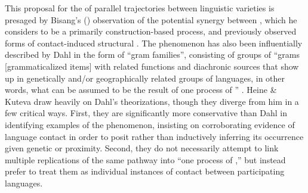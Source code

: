 \documentclass[output=paper]{langsci/langscibook}
\begin{document}
This proposal for the  of parallel  trajectories between linguistic varieties is presaged by Bisang's (\citeyear{Bisang1998}) observation of the potential synergy between , which he considers to be a primarily construction-based process, and previously observed forms of contact-induced structural . The phenomenon has also been influentially described by Dahl in the form of “gram families”, consisting of groups of “grams [grammaticalized items] with related functions and diachronic sources that show up in genetically and/or geographically related groups of languages, in other words, what can be assumed to be the result of one process of ” \citep[1469]{Dahl2001}. Heine \& Kuteva draw heavily on Dahl’s theorizations, though they diverge from him in a few critical ways. First, they are significantly more conservative than Dahl in identifying examples of the phenomenon, insisting on corroborating evidence of language contact in order to posit  rather than inductively inferring its occurrence given genetic  or proximity. Second, they do not necessarily attempt to link multiple replications of the same  pathway into “one process of ,” but instead prefer to treat them as individual instances of contact between participating languages. 
\end{document}
